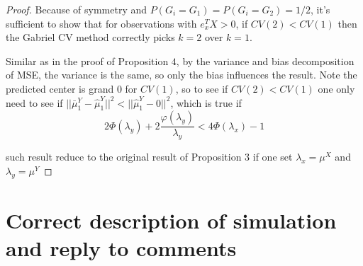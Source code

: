 \documentclass[11pt]{article}
\begin{document}
\begin{proof}
Because of symmetry and $P(G_i=G_1) = P(G_i=G_2) = 1/2$, it's sufficient to show that for observations with  $e^T_x X > 0$, if $CV(2) < CV(1)$ then the Gabriel CV method correctly picks $k=2$ over $k=1$. 

Similar as in the proof of Proposition $4$, by the variance and bias decomposition of MSE, the variance is the same, so only the bias influences the result. Note the predicted center is grand $0$ for $CV(1)$, so to see if  $CV(2) < CV(1)$ one only need to see if $||\bar{\mu}^Y_1-\hat{\mu}^Y_1||^2 < ||\hat{\mu}^Y_1 - 0||^2$, which is true if 
\[ 2\Phi(\lambda_y) + 2 \frac{\varphi(\lambda_y)}{\lambda_y} < 4\Phi(\lambda_x)-1 \] 

such result reduce to the original result of Proposition $3$ if one set $\lambda_x = \mu^X$ and $\lambda_y = \mu^Y$

\end{proof}


\section{Correct description of simulation and reply to comments}
\end{document}
